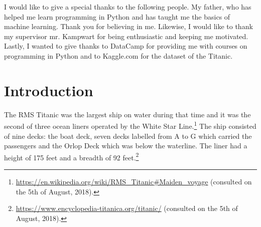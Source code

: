 \documentclass[11pt]{article}
\begin{document}
I would like to give a special thanks to the following people. My father, who has helped me learn programming in Python and has taught me the basics of machine learning. Thank you for believing in me. Likewise, I would like to thank my supervisor mr. Kampwart for being enthusiastic and keeping me motivated. Lastly, I wanted to give thanks to DataCamp for providing me with courses on programming in Python and to Kaggle.com for the dataset of the Titanic. 

\newpage

\setcounter{tocdepth}{2}
\tableofcontents

\newpage


\section{Introduction}
\label{sec:org2a38835}

The RMS Titanic was the largest ship on water during that time and it was the second of three  ocean liners operated by the White Star Line.\footnote{\url{https://en.wikipedia.org/wiki/RMS\_Titanic\#Maiden\_voyage} (consulted on the 5th of August, 2018).} The ship consisted of nine decks: the boat deck, seven decks labelled from A to G which carried the passengers and the Orlop Deck which was below the waterline. The liner had a height of 175 feet and a breadth of 92 feet.\footnote{\url{https://www.encyclopedia-titanica.org/titanic/} (consulted on the 5th of August, 2018).} 
\end{document}
